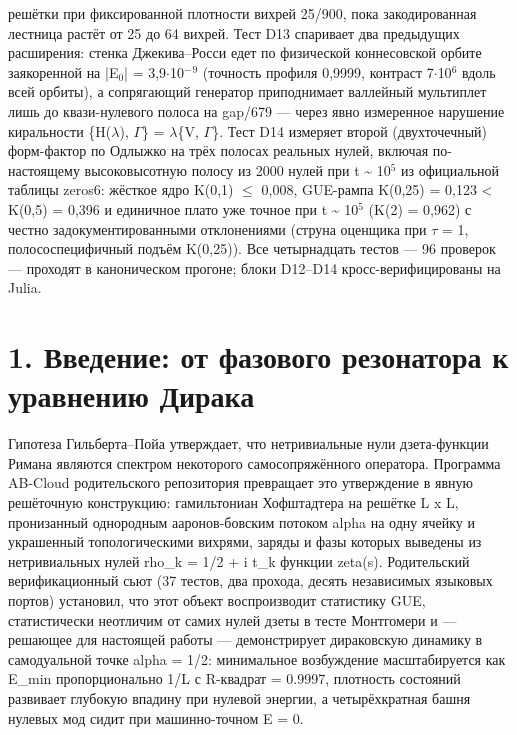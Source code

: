 \documentclass[11pt,a4paper]{article}
\begin{document}
\begin{tcolorbox}[breakable, colback=labblue!6, colframe=labblue!70!black, boxrule=0.6pt, title={Abstract / Аннотация}]
решётки при фиксированной плотности вихрей 25/900, пока закодированная лестница растёт от 25 до 64 вихрей. Тест D13 спаривает два предыдущих расширения: стенка Джекива--Росси едет по физической коннесовской орбите заякоренной на |E$_{0}$| = 3,9$\cdot$10$^{-}$$^{9}$ (точность профиля 0,9999, контраст 7$\cdot$10$^{6}$ вдоль всей орбиты), а сопрягающий генератор приподнимает валлейный мультиплет лишь до квази-нулевого полоса на gap/679 --- через явно измеренное нарушение киральности \{H($\lambda$), $\Gamma$\} = $\lambda$\{V, $\Gamma$\}. Тест D14 измеряет второй (двухточечный) форм-фактор по Одлыжко на трёх полосах реальных нулей, включая по-настоящему высоковысотную полосу из 2000 нулей при t \textasciitilde{} 10$^{5}$ из официальной таблицы zeros6: жёсткое ядро K(0,1) $\le$ 0,008, GUE-рампа K(0,25) = 0,123 < K(0,5) = 0,396 и единичное плато уже точное при t \textasciitilde{} 10$^{5}$ (K(2) = 0,962) с честно задокументированными отклонениями (струна оценщика при $\tau$ = 1, полососпецифичный подъём K(0,25)). Все четырнадцать тестов --- 96 проверок --- проходят в каноническом прогоне; блоки D12--D14 кросс-верифицированы на Julia.
\end{tcolorbox}
\tableofcontents
\newpage
\section{1. Введение: от фазового резонатора к уравнению Дирака}
Гипотеза Гильберта--Пойа утверждает, что нетривиальные нули дзета-функции Римана являются спектром некоторого самосопряжённого оператора. Программа AB-Cloud родительского репозитория превращает это утверждение в явную решёточную конструкцию: гамильтониан Хофштадтера на решётке L x L, пронизанный однородным ааронов-бовским потоком alpha на одну ячейку и украшенный топологическими вихрями, заряды и фазы которых выведены из нетривиальных нулей rho\_\allowbreak{}k = 1/2 + i t\_\allowbreak{}k функции zeta(s). Родительский верификационный сьют (37 тестов, два прохода, десять независимых языковых портов) установил, что этот объект воспроизводит статистику GUE, статистически неотличим от самих нулей дзеты в тесте Монтгомери и --- решающее для настоящей работы --- демонстрирует дираковскую динамику в самодуальной точке alpha = 1/2: минимальное возбуждение масштабируется как E\_\allowbreak{}min пропорционально 1/L с R-квадрат = 0.9997, плотность состояний развивает глубокую впадину при нулевой энергии, а четырёхкратная башня нулевых мод сидит при машинно-точном E = 0.
\end{document}
